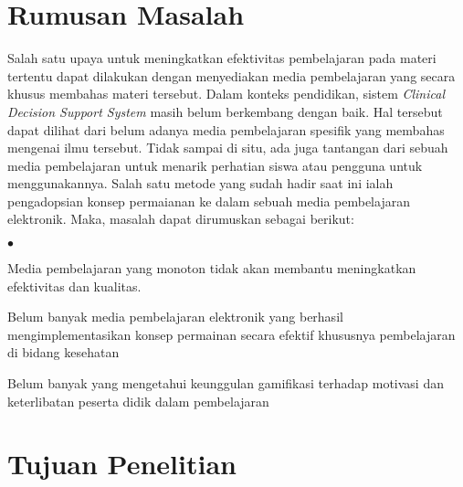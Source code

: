 
\newpage
\section{Rumusan Masalah}
Salah satu upaya untuk meningkatkan efektivitas pembelajaran pada materi tertentu dapat dilakukan dengan menyediakan media pembelajaran yang secara khusus membahas materi tersebut.
Dalam konteks pendidikan, sistem \textit{Clinical Decision Support System} masih belum berkembang dengan baik.
Hal tersebut dapat dilihat dari belum adanya media pembelajaran spesifik yang membahas mengenai ilmu tersebut.
Tidak sampai di situ, ada juga tantangan dari sebuah media pembelajaran untuk menarik perhatian siswa atau pengguna untuk menggunakannya.
Salah satu metode yang sudah hadir saat ini ialah pengadopsian konsep permaianan ke dalam sebuah media pembelajaran elektronik. 
Maka, masalah dapat dirumuskan sebagai berikut:
\begin{list}{\small$\bullet$}{}
	\item Media pembelajaran yang monoton tidak akan membantu meningkatkan efektivitas dan kualitas.
	\item Belum banyak media pembelajaran elektronik yang berhasil mengimplementasikan konsep permainan secara efektif khususnya pembelajaran di bidang kesehatan
	\item Belum banyak yang mengetahui keunggulan gamifikasi terhadap motivasi dan keterlibatan peserta didik dalam pembelajaran
\end{list}



\section{Tujuan Penelitian}

